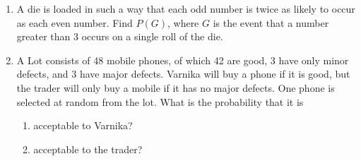 \begin{enumerate}[label=\thesection.\arabic*,ref=\thesection.\theenumi]
	\item  A die is loaded in such a way that each odd number is twice as likely to occur as
each even number. Find $P(G)$, where $G$ is the event that a number greater than
3 occurs on a single roll of the die.
\\
\solution
		
	\item A Lot consists of 48 mobile phones, of which 42 are good, 3 have only minor defects, and 3 have major defects. Varnika will buy a phone if it is good, but the trader will only buy a mobile if it has no major defects. One phone is selected at random from the lot. What is the probability that it is
\begin{enumerate}
	\item acceptable to Varnika?
            \item acceptable to the trader?
\end{enumerate}
\end{enumerate}
